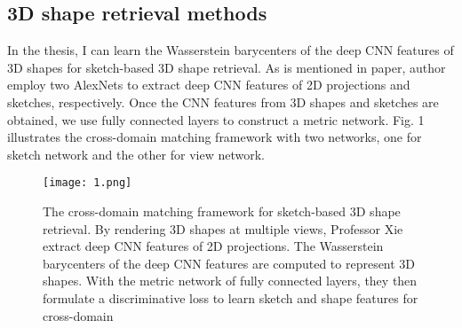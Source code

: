 \documentclass{article}
\begin{document}
\subsection{3D shape retrieval methods}
  In the thesis, I can learn the Wasserstein barycenters of the deep CNN features of 3D shapes for sketch-based 3D shape retrieval. As is mentioned in paper, author employ two AlexNets to extract deep CNN features of 2D projections and sketches, respectively. Once the CNN features from 3D shapes and sketches are obtained, we use fully connected layers to construct a metric network. Fig. 1 illustrates the cross-domain matching framework with two networks, one for sketch network and the other for view network.
  
\begin{figure}[ht]
\centering
\texttt{[image: 1.png]}
\caption{The cross-domain matching framework for sketch-based 3D shape retrieval. By rendering 3D shapes at multiple views, Professor Xie extract deep CNN features of 2D projections. The Wasserstein barycenters of the deep CNN features are computed to represent 3D shapes. With the metric network of fully connected layers, they then formulate a discriminative loss to learn sketch and shape features for cross-domain}
\end{figure}
  

\end{document}
